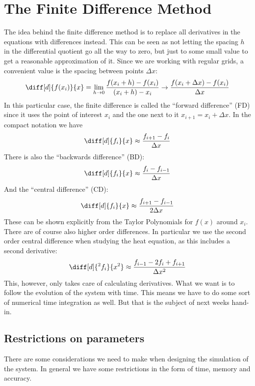 \documentclass[sigconf]{acmart}
\begin{document}
\section{The Finite Difference Method}
The idea behind the finite difference method is to replace all derivatives in the equations with differences instead. This can be seen as not letting the spacing $ h $ in the differential quotient go all the way to zero, but just to some small value to get a reasonable approximation of it. Since we are working with regular grids, a convenient value is the spacing between points $ \Delta x $:
\begin{equation}\label{key}
	\diff[d]{f(x_i)}{x} = \lim\limits_{h\to 0} \frac{f(x_i + h) - f(x_i)}{(x_i+h) - x_i} \to \frac{f(x_i + \Delta x) - f(x_i)}{\Delta x}
\end{equation}
In this particular case, the finite difference is called the ``forward difference'' (FD) since it uses the point of interest $ x_i $ and the one next to it $ x_{i+1} = x_i + \Delta x $. In the compact notation we have
\begin{equation}\label{key}
	\diff[d]{f_i}{x} \approx \frac{f_{i+1} - f_{i}}{\Delta x}
\end{equation}
There is also the ``backwards difference'' (BD):
\begin{equation}\label{key}
	\diff[d]{f_i}{x} \approx \frac{f_{i} - f_{i-1}}{\Delta x}
\end{equation}
And the ``central difference'' (CD):
\begin{equation}\label{key}
	\diff[d]{f_i}{x} \approx \frac{f_{i+1} - f_{i-1}}{2 \Delta x}
\end{equation}
These can be shown explicitly from the Taylor Polynomials for $ f(x) $ around $ x_i $. There are of course also higher order differences. In particular we use the second order central difference when studying the heat equation, as this includes a second derivative:
\begin{equation}\label{key}
	\diff[d]{^2 f_i}{x^2} \approx \frac{f_{i-1} - 2f_i + f_{i+1}}{\Delta x^2}
\end{equation}
This, however, only takes care of calculating derivatives. What we want is to follow the evolution of the system with time. This means we have to do some sort of numerical time integration as well. But that is the subject of next weeks hand-in.

\subsection{Restrictions on parameters}
There are some considerations we need to make when designing the simulation of the system. In general we have some restrictions in the form of time, memory and accuracy.
\end{document}
